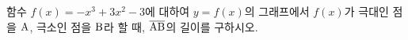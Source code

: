 함수 $f(x)=-x^3+3x^2-3$에 대하여 $y=f(x)$의 그래프에서 $f(x)$가 극대인 점을 $\mathrm{A}$, 극소인 점을 $\mathrm{B}$라 할 때, $\overline{\mathrm{AB}}$의 길이를 구하시오.
